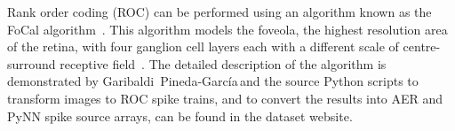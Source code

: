%
Rank order coding (ROC) can be performed using an algorithm known as the
{FoCal algorithm~\citep{sen2009evaluating}}.
This algorithm models the foveola, the highest resolution area of the retina, with four ganglion cell layers each with a different scale of centre-surround receptive field~\citep{kolb2003retina}.
The detailed description of the algorithm is demonstrated \DIFdelbegin {}\DIFdelend by Garibaldi~Pineda-Garc\'ia\,\DIFaddbegin {}\DIFaddend and the source Python scripts to transform images to ROC spike trains, and to convert the results into AER and PyNN spike source arrays, can be found in the dataset website.
%
%
%
